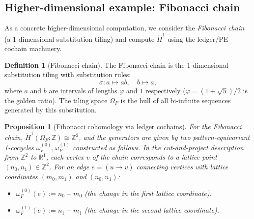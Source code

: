 \documentclass[12pt]{article}
\newtheorem{proposition}[theorem]{Proposition}
\theoremstyle{definition}
\newtheorem{definition}[theorem]{Definition}
\theoremstyle{remark}
\newcommand{\RR}{\mathbb{R}}
\newcommand{\ZZ}{\mathbb{Z}}
\begin{document}
\subsection{Higher-dimensional example: Fibonacci chain}

As a concrete higher-dimensional computation, we consider the \emph{Fibonacci chain} (a 1-dimensional substitution tiling) and compute $\check{H}^1$ using the ledger/PE-cochain machinery.

\begin{definition}[Fibonacci chain]
The Fibonacci chain is the 1-dimensional substitution tiling with substitution rules:
\[
\sigma: a \mapsto ab, \quad b \mapsto a,
\]
where $a$ and $b$ are intervals of lengths $\varphi$ and $1$ respectively ($\varphi = (1+\sqrt{5})/2$ is the golden ratio). The tiling space $\Omega_F$ is the hull of all bi-infinite sequences generated by this substitution.
\end{definition}

\begin{proposition}[Fibonacci cohomology via ledger cochains]
\label{prop:fibonacci}
For the Fibonacci chain, $\check{H}^1(\Omega_F; \ZZ) \cong \ZZ^2$, and the generators are given by two pattern-equivariant 1-cocycles $\omega_F^{(0)}, \omega_F^{(1)}$ constructed as follows. In the cut-and-project description from $\ZZ^2$ to $\RR^1$, each vertex $v$ of the chain corresponds to a lattice point $(n_0, n_1) \in \ZZ^2$. For an edge $e = (u \to v)$ connecting vertices with lattice coordinates $(m_0, m_1)$ and $(n_0, n_1)$:
\begin{itemize}
\item $\omega_F^{(0)}(e) := n_0 - m_0$ (the change in the first lattice coordinate).
\item $\omega_F^{(1)}(e) := n_1 - m_1$ (the change in the second lattice coordinate).
\end{itemize}
\end{proposition}
\end{document}
